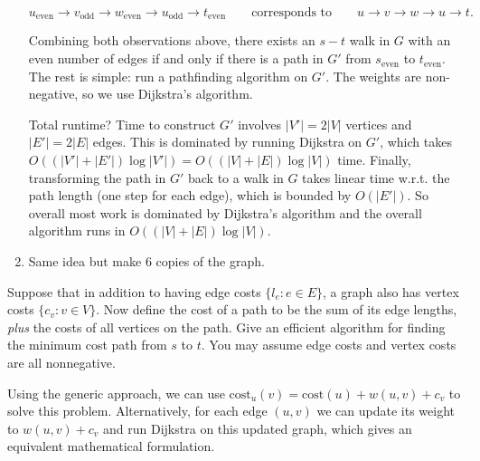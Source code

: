 \begin{solution}
\begin{enumerate}
      \[u_\text{even} \to v_\text{odd} \to w_\text{even} \to u_{\text{odd}} \to t_\text{even} \qquad \text{corresponds to}\qquad u\to v\to w \to u\to t.\]

      Combining both observations above, there exists an $s-t$ walk in $G$ with an even number of edges if and only if there is a path in $G'$ from $s_\text{even}$ to $t_\text{even}$. The rest is simple: run a pathfinding algorithm on $G'$. The weights are non-negative, so we use Dijkstra's algorithm. 

      Total runtime? Time to construct $G'$ involves $\lvert V'\rvert = 2\lvert V\lvert$ vertices and $\lvert E'\rvert = 2\lvert E\rvert$ edges. This is dominated by running Dijkstra on $G'$, which takes $O((|V'| +\lvert E'\rvert )\log \lvert V'\rvert) = O((|V|+\lvert E\rvert)\log \lvert V\rvert)$ time. Finally, transforming the path in $G'$ back to a walk in $G$ takes linear time w.r.t. the path length (one step for each edge), which is bounded by $O(\lvert E'\rvert)$.  So overall most work is dominated by Dijkstra's algorithm and the overall algorithm runs in $O((|V|+\lvert E\rvert) \log \lvert V\rvert)$.

      \item Same idea but make 6 copies of the graph. 
    \end{enumerate}
  \end{solution}

  \begin{exercise}
    Suppose that in addition to having edge costs $\{l_e:e\in E\}$, a graph also has vertex costs $\{c_v:v\in V\}$. Now define the cost of a path to be the sum of its edge lengths, \textit{plus} the costs of all vertices on the path. Give an efficient algorithm for finding the minimum cost path from $s$ to $t$. You may assume edge costs and vertex costs are all nonnegative.
  \end{exercise}
  \begin{solution}
    Using the generic approach, we can use $\text{cost}_u(v)=\text{cost}(u)+w(u,v)+c_v$ to solve this problem. Alternatively, for each edge $(u,v)$ we can update its weight to $w(u,v)+c_v$ and run Dijkstra on this updated graph, which gives an equivalent mathematical formulation.
  \end{solution}


